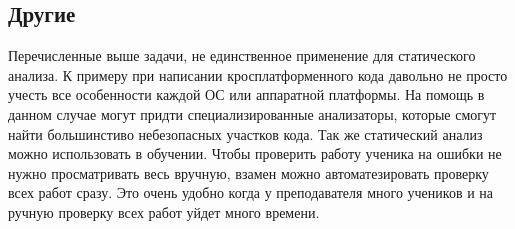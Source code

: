 \subsection {Другие}
Перечисленные выше задачи, не единственное применение для статического анализа. К примеру 
при написании кросплатформенного кода давольно не просто учесть все особенности каждой ОС
или аппаратной платформы. На помощь в данном случае могут придти специализированные анализаторы,
которые смогут найти большинстиво небезопасных участков кода. 
Так же статический анализ можно использовать в обучении. Чтобы проверить работу ученика на ошибки
не нужно просматривать весь вручную, взамен можно автоматезировать проверку всех работ сразу.
Это очень удобно когда у преподавателя много учеников и на ручную проверку всех работ уйдет
много времени. 

